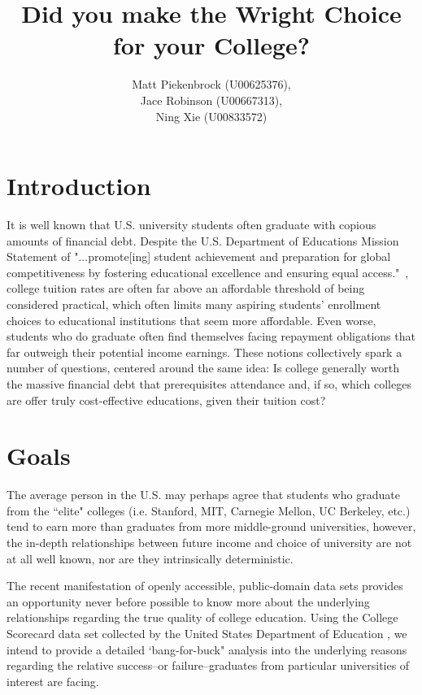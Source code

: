 \documentclass[10pt]{article}
\author{Matt Piekenbrock (U00625376), \\ Jace Robinson (U00667313), \\Ning Xie (U00833572)}
\title{Did you make the Wright Choice for your College?}
\begin{document}
\maketitle

\section*{Introduction}
    It is well known that U.S. university students often graduate with copious amounts of financial debt. Despite the U.S. Department of Educations Mission Statement of "...promote[ing] student achievement and preparation for global competitiveness by fostering educational excellence and ensuring equal access."~\cite{Overview75:online}, college tuition rates are often far above an affordable threshold of being considered practical, which often limits many aspiring students' enrollment choices to educational institutions that seem more affordable. Even worse, students who do graduate often find themselves facing repayment obligations that far outweigh their potential income earnings. These notions collectively spark a number of questions, centered around the same idea: Is college generally worth the massive financial debt that prerequisites attendance and, if so, which colleges are offer truly cost-effective educations, given their tuition cost? 
    
\section*{Goals} 
    The average person in the U.S. may perhaps agree that students who graduate from the ``elite" colleges (i.e. Stanford, MIT, Carnegie Mellon, UC Berkeley, etc.) tend to earn more than graduates from more middle-ground universities, however, the in-depth relationships between future income and choice of university are not at all well known, nor are they intrinsically deterministic. 

    The recent manifestation of openly accessible, public-domain data sets provides an opportunity never before possible to know more about the underlying relationships regarding the true quality of college education. Using the College Scorecard data set collected by the United States Department of Education \cite{collegeScorecard}, we intend to provide a detailed `bang-for-buck" analysis into the underlying reasons regarding the relative success--or failure--graduates from particular universities of interest are facing. 
   
\end{document}
